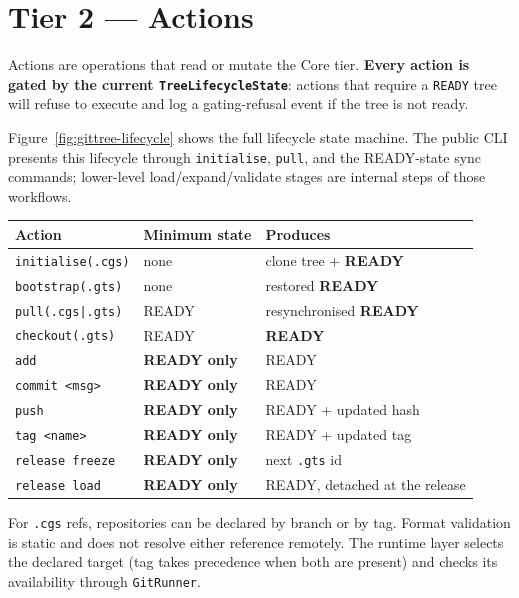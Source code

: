 \section{Tier 2 — Actions}
\label{sec:tier-actions}

Actions are operations that read or mutate the Core tier.  \textbf{Every
action is gated by the current \texttt{TreeLifecycleState}}: actions that
require a \texttt{READY} tree will refuse to execute and log a gating-refusal
event if the tree is not ready.

Figure~\ref{fig:gittree-lifecycle} shows the full lifecycle state machine. The
public CLI presents this lifecycle through \texttt{initialise}, \texttt{pull},
and the READY-state sync commands; lower-level load/expand/validate stages are
internal steps of those workflows.

\begin{center}
\begin{tabular}{lll}
\textbf{Action} & \textbf{Minimum state} & \textbf{Produces} \\
\hline
\texttt{initialise(.cgs)}              & none        & clone tree + \textbf{READY} \\
\texttt{bootstrap(.gts)}               & none        & restored \textbf{READY} \\
\texttt{pull(.cgs|.gts)}               & READY       & resynchronised \textbf{READY} \\
\texttt{checkout(.gts)}                & READY       & \textbf{READY} \\
\texttt{add}                           & \textbf{READY only} & READY \\
\texttt{commit <msg>}                  & \textbf{READY only} & READY \\
\texttt{push}                          & \textbf{READY only} & READY + updated hash \\
\texttt{tag <name>}                    & \textbf{READY only} & READY + updated tag \\
\texttt{release freeze}                & \textbf{READY only} & next \texttt{.gts} id \\
\texttt{release load}                  & \textbf{READY only} & READY, detached at the release \\
\hline
\end{tabular}
\end{center}

For \texttt{.cgs} refs, repositories can be declared by branch or by tag.
Format validation is static and does not resolve either reference remotely.
The runtime layer selects the declared target (tag takes precedence when both
are present) and checks its availability through \texttt{GitRunner}.

